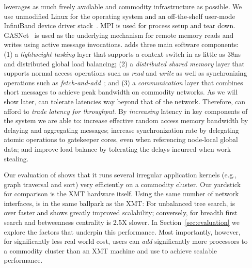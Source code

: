 \Grappa leverages as much freely available and commodity infrastructure as
possible. We use unmodified Linux for the operating system and an
off-the-shelf user-mode InfiniBand device driver stack~\cite{OFED}. MPI is
used for process setup and tear down. GASNet~\cite{gasnet} is used as the
underlying mechanism for remote memory reads and writes using active message
invocations. \Grappa adds three main software components: (1) a
\emph{lightweight tasking\/} layer that supports a context switch in as little
as 38ns and distributed global load balancing; (2) a \emph{distributed shared
memory\/} layer that supports normal access operations such as \emph{read\/}
and \emph{write\/} as well as synchronizing operations such as
\emph{fetch-and-add\/}~\cite{fetchandadd}; and (3) a \emph{communication\/}
layer that combines short messages to achieve peak bandwidth on commodity
networks. As we will show later, \Grappa can tolerate latencies way beyond
that of the network. Therefore, \Grappa can afford to \emph{trade latency for
throughput}. By {\em increasing\/} latency in key components of the system we
are able to: increase effective random access memory bandwidth by delaying and
aggregating messages; increase synchronization rate by delegating atomic
operations to gatekeeper cores, even when referencing node-local global data;
and improve load balance by tolerating the delays incurred when work-stealing.

Our evaluation of \Grappa shows that it runs several irregular application
kernels (e.g., graph traversal and sort) very efficiently on a commodity
cluster. Our yardstick for comparison is the XMT hardware itself. Using the
same number of network interfaces, \Grappa is in the same ballpark as the XMT:
For unbalanced tree search, \Grappa is over  faster and shows greatly
improved scalability; conversely, for breadth first search and betweenness
centrality \Grappa is 2.5X slower. In Section~\ref{sec:evaluation} we explore
the factors that underpin this performance. Most importantly, however, for
significantly less real world cost, users can \emph{add\/} significantly more
processors to a commodity cluster than an XMT machine and use \Grappa to
achieve scalable performance. 


